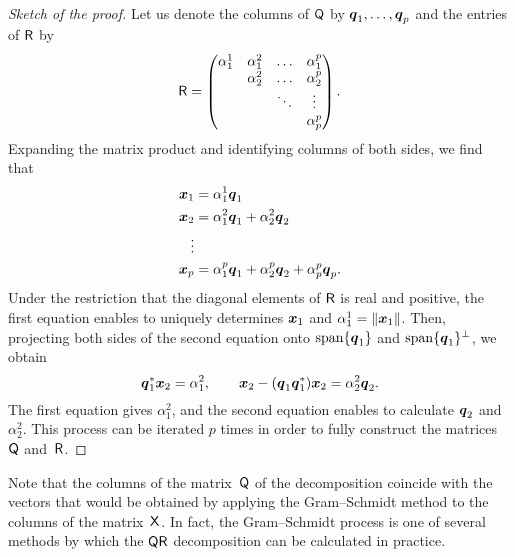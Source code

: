 \begin{proof}
    [Sketch of the proof]
    Let us denote the columns of $\mathsf Q$ by $\mathbf{\boldsymbol{q}}_1, \dotsc, \mathbf{\boldsymbol{q}}_p$ and the entries of $\mathsf R$ by
    \[
        \mathsf R =
        \begin{pmatrix}
            \alpha^1_1 & \alpha^2_1 & \hdots & \alpha^p_1 \\
                       & \alpha^2_2 & \hdots & \alpha^p_2 \\
                       &            & \ddots & \vdots \\
                       & & & \alpha^p_p
        \end{pmatrix}.
    \]
    Expanding the matrix product and identifying columns of both sides,
    we find that
    \begin{align*}
        \mathbf{\boldsymbol{x}}_1 &= \alpha^1_1 \mathbf{\boldsymbol{q}}_1 \\
        \mathbf{\boldsymbol{x}}_2 &= \alpha^2_1 \mathbf{\boldsymbol{q}}_1 + \alpha^2_2 \mathbf{\boldsymbol{q}}_2 \\
        \vdots \\
        \mathbf{\boldsymbol{x}}_p &= \alpha^p_1 \mathbf{\boldsymbol{q}}_1 + \alpha^p_2 \mathbf{\boldsymbol{q}}_2 + \alpha^p_p \mathbf{\boldsymbol{q}}_p.
    \end{align*}
    Under the restriction that the diagonal elements of $\mathsf R$ is real and positive,
    the first equation enables to uniquely determines $\mathbf{\boldsymbol{x}}_1$ and $\alpha^1_1 = \lVert\mathbf{\boldsymbol{x}}_1\rVert$.
    Then, projecting both sides of the second equation onto $\operatorname{span} \{ \mathbf{\boldsymbol{q}}_1 \}$ and $\operatorname{span} \{ \mathbf{\boldsymbol{q}}_1 \}^\perp$,
    we obtain
    \[
        \mathbf{\boldsymbol{q}}_1^* \mathbf{\boldsymbol{x}}_2 = \alpha_1^2, \qquad
        \mathbf{\boldsymbol{x}}_2 - (\mathbf{\boldsymbol{q}}_1 \mathbf{\boldsymbol{q}}_1^*) \mathbf{\boldsymbol{x}}_2 = \alpha^2_2 \mathbf{\boldsymbol{q}}_2.
    \]
    The first equation gives $\alpha_1^2$,
    and the second equation enables to calculate $\mathbf{\boldsymbol{q}}_2$ and $\alpha^2_2$.
    This process can be iterated $p$ times in order to fully construct the matrices~$\mathsf Q$ and~$\mathsf R$.
\end{proof}
Note that the columns of the matrix~$\mathsf Q$ of the decomposition coincide with the vectors that
would be obtained by applying the Gram--Schmidt method to the columns of the matrix~$\mathsf X$.
In fact, the Gram--Schmidt process is one of several methods by which the $\mathsf Q \mathsf R$ decomposition can be calculated in practice.

